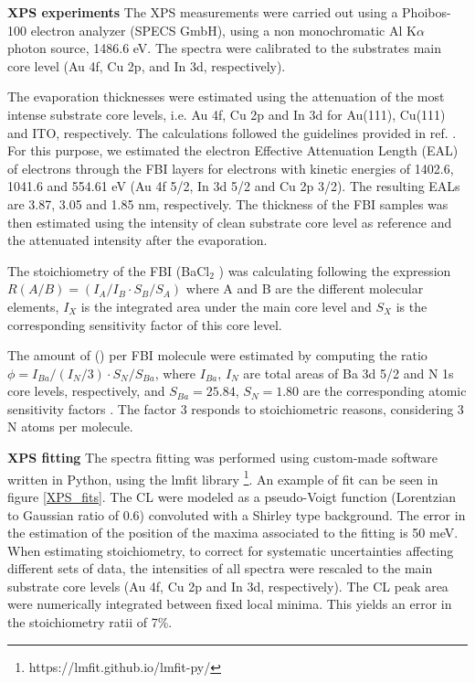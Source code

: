 \documentclass[aps,prl,reprint,longbibliography,superscriptaddress, english]{revtex4-1}
\def\BappCl{BaCl$_2$ }
\begin{document}
\textbf{XPS experiments}
The XPS measurements were carried out using a Phoibos-100 electron analyzer (SPECS GmbH), using a non monochromatic Al K$\alpha$ photon source, 1486.6 eV. The spectra were calibrated to the substrates main core level (Au 4f, Cu 2p, and In 3d, respectively). 

The evaporation thicknesses were estimated using the attenuation of the most intense substrate core levels, i.e. Au 4f, Cu 2p and In 3d for Au(111), Cu(111) and ITO, respectively. The calculations followed the guidelines provided in ref. \cite{powell_practical_2020}. For this purpose, we estimated the electron Effective Attenuation Length (EAL) of electrons through the FBI layers for electrons with kinetic energies of 1402.6, 1041.6 and 554.61 eV (Au 4f 5/2, In 3d 5/2 and Cu 2p 3/2). The resulting EALs are 3.87, 3.05 and 1.85 nm, respectively. The thickness of the FBI samples was then estimated using the intensity of clean substrate core level as reference and the attenuated intensity after the evaporation. 

The stoichiometry of the FBI (\BappCl) was calculating following the expression $ R(A/B)=(I_{A}/I_{B} \cdot S_B/S_{A})$ where A and B are the different molecular elements, $I_{X}$ is the integrated area under the main core level and $S_{X}$ is the corresponding sensitivity factor of this core level.

The amount of \Bapp (\Nap) per FBI molecule were estimated by computing  the ratio $\phi=I_{Ba}/(I_N/3) \cdot S_N/S_{Ba} $, where $I_{Ba}$, $I_N$ are total areas  of Ba 3d 5/2 and  N 1s core  levels, respectively, and $S_{Ba} = 25.84$, $S_N = 1.80$ are the corresponding atomic sensitivity factors \cite{scofield_hartree-slater_1976}. The factor 3 responds to stoichiometric reasons, considering 3 N atoms per molecule.

\textbf{XPS fitting}
The spectra fitting was performed using custom-made software written in Python, using the lmfit library \footnote{https://lmfit.github.io/lmfit-py/}. An example of fit can be seen in figure \ref{XPS_fits}. The CL were modeled as a pseudo-Voigt function (Lorentzian to Gaussian ratio of 0.6) convoluted with a Shirley type background. The error in the estimation of the position of the maxima associated to the fitting is 50 meV. When estimating stoichiometry, to correct for systematic uncertainties affecting different sets of data, the intensities of all spectra were rescaled to the main substrate core levels (Au 4f, Cu 2p and In 3d, respectively). The CL peak area were numerically integrated between fixed local minima. This yields an error in the stoichiometry ratii of 7\%. 
\end{document}
